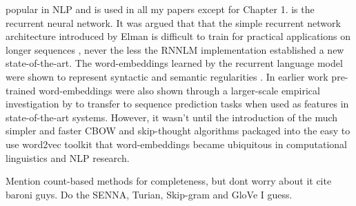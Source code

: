 popular in NLP and is used in all my papers except for Chapter 1. is the recurrent neural network. It was argued that that the simple recurrent network architecture introduced by Elman is difficult to train for practical applications on longer sequences \cite{bengio1994learning}, never the less the RNNLM implementation \cite{mikolov2010recurrent} established a new state-of-the-art. The word-embeddings learned by the recurrent language model were shown to represent syntactic and semantic regularities \cite{mikolov2013linguistic}.  In earlier work pre-trained word-embeddings were also shown through a larger-scale empirical investigation by \cite{turian2010word} to transfer to sequence prediction tasks when used as features in state-of-the-art systems.
However, it wasn't until the introduction of the much simpler and faster CBOW and skip-thought algorithms packaged into the easy to use word2vec toolkit that word-embeddings became ubiquitous in computational linguistics and NLP research.



Mention count-based methods for completeness, but dont worry about it cite baroni guys.
Do the SENNA, Turian, Skip-gram and GloVe I guess.

